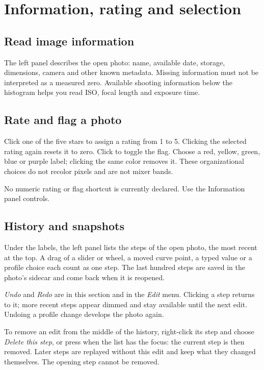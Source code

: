 \chapter{Information, rating and selection}
\section{Read image information}
The left panel describes the open photo: name, available date, storage,
dimensions, camera and other known metadata. Missing information must not be
interpreted as a measured zero. Available shooting information below the
histogram helps you read ISO, focal length and exposure time.

\section{Rate and flag a photo}
Click one of the five stars to assign a rating from 1 to 5. Clicking the selected
rating again resets it to zero. Click to toggle the flag. Choose a red,
yellow, green, blue or purple label; clicking the same color removes it.
These organizational choices do not recolor pixels and are not mixer bands.

No numeric rating or flag shortcut is currently declared. Use the Information
panel controls.

\section{History and snapshots}
Under the labels, the left panel lists the steps of the open photo, the most
recent at the top. A drag of a slider or wheel, a moved curve point, a typed
value or a profile choice each count as one step. The last hundred steps are
saved in the photo's sidecar and come back when it is reopened.

\emph{Undo} and \emph{Redo} are in this section and in the \emph{Edit} menu.
Clicking a step returns to it; more recent steps appear dimmed and stay
available until the next edit. Undoing a profile change develops the photo
again.

To remove an edit from the middle of the history, right-click its step and
choose \emph{Delete this step}, or press  when the list has the
focus: the current step is then removed. Later steps are replayed without this
edit and keep what they changed themselves. The opening step cannot be removed.

